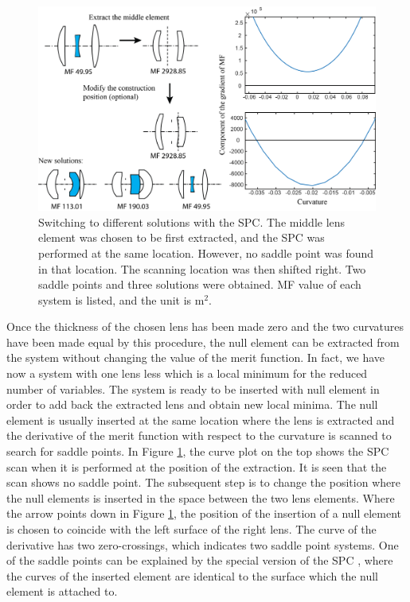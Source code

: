 \begin{figure}[h!]
    \centering
    \includegraphics[scale=0.68]{chapter-2/figures/spc_switch.png}
    \caption{Switching to different solutions with the SPC. The middle lens element was chosen to be first extracted, and the SPC was performed at the same location. However, no saddle point was found in that location. The scanning location was then shifted right. Two saddle points and three solutions were obtained. MF value of each system is listed, and the unit is \textmu m$^2$. }
    \label{fig:SPC-switch-example}
\end{figure}

Once the thickness of the chosen lens has been made zero and the two curvatures have been made equal by this procedure, the null element can be extracted from the system without changing the value of the merit function. In fact, we have now a system with one lens less which is a local minimum for the reduced number of variables. The system is ready to be inserted with null element in order to add back the extracted lens and obtain new local minima. The null element is usually inserted at the same location where the lens is extracted and the derivative of the merit function with respect to the curvature is scanned to search for saddle points. In Figure \ref{fig:SPC-switch-example}, the curve plot on the top shows the SPC scan when it is performed at the position of the extraction. It is seen that the scan shows no saddle point. The subsequent step is to change the position where the null elements is inserted in the space between the two lens elements. Where the arrow points down in Figure \ref{fig:SPC-switch-example}, the position of the insertion of a null element is chosen to coincide with the left surface of the right lens. The curve of the derivative has two zero-crossings, which indicates two saddle point systems. One of the saddle points can be explained by the special version of the SPC \cite{BociortSPCSexplained}, where the curves of the inserted element are identical to the surface which the null element is attached to. 

